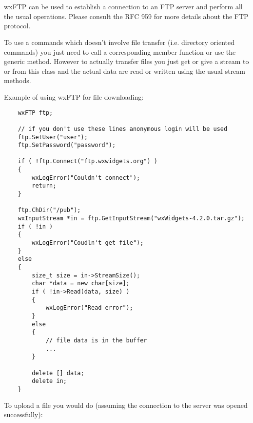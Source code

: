 
\section{}\label{wxftp}

wxFTP can be used to establish a connection to an FTP server and perform all the
usual operations. Please consult the RFC 959 for more details about the FTP
protocol.

To use a commands which doesn't involve file transfer (i.e. directory oriented
commands) you just need to call a corresponding member function or use the
generic  method. However to actually
transfer files you just get or give a stream to or from this class and the
actual data are read or written using the usual stream methods.

Example of using wxFTP for file downloading:

\begin{verbatim}
    wxFTP ftp;

    // if you don't use these lines anonymous login will be used
    ftp.SetUser("user");
    ftp.SetPassword("password");

    if ( !ftp.Connect("ftp.wxwidgets.org") )
    {
        wxLogError("Couldn't connect");
        return;
    }

    ftp.ChDir("/pub");
    wxInputStream *in = ftp.GetInputStream("wxWidgets-4.2.0.tar.gz");
    if ( !in )
    {
        wxLogError("Coudln't get file");
    }
    else
    {
        size_t size = in->StreamSize();
        char *data = new char[size];
        if ( !in->Read(data, size) )
        {
            wxLogError("Read error");
        }
        else
        {
            // file data is in the buffer
            ...
        }

        delete [] data;
        delete in;
    }
\end{verbatim}

To upload a file you would do (assuming the connection to the server was opened
successfully):


